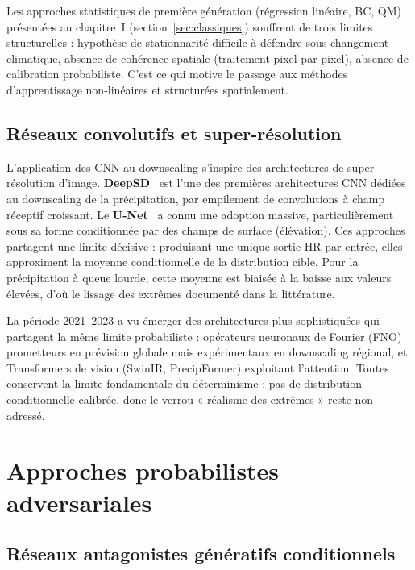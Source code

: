 \documentclass[14pt,a4paper,openany]{extreport}
\begin{document}
Les approches statistiques de première génération (régression linéaire, BC, QM) présentées au chapitre~I (section~\ref{sec:classiques}) souffrent de trois limites structurelles : hypothèse de stationnarité difficile à défendre sous changement climatique, absence de cohérence spatiale (traitement pixel par pixel), absence de calibration probabiliste. C'est ce qui motive le passage aux méthodes d'apprentissage non-linéaires et structurées spatialement.

\subsection{Réseaux convolutifs et super-résolution}
\label{ssec:soa-cnn}

L'application des CNN au downscaling s'inspire des architectures de super-résolution d'image. \textbf{DeepSD}~\cite{vandal_deepsd_2017} est l'une des premières architectures CNN dédiées au downscaling de la précipitation, par empilement de convolutions à champ réceptif croissant. Le \textbf{U-Net}~\cite{ronneberger_unet_2015} a connu une adoption massive, particulièrement sous sa forme conditionnée par des champs de surface (élévation). Ces approches partagent une limite décisive : produisant une unique sortie HR par entrée, elles approximent la moyenne conditionnelle de la distribution cible. Pour la précipitation à queue lourde, cette moyenne est biaisée à la baisse aux valeurs élevées, d'où le lissage des extrêmes documenté dans la littérature.

La période 2021--2023 a vu émerger des architectures plus sophistiquées qui partagent la même limite probabiliste : opérateurs neuronaux de Fourier (FNO) prometteurs en prévision globale mais expérimentaux en downscaling régional, et Transformers de vision (SwinIR, PrecipFormer) exploitant l'attention. Toutes conservent la limite fondamentale du déterminisme : pas de distribution conditionnelle calibrée, donc le verrou « réalisme des extrêmes » reste non adressé.

\section{Approches probabilistes adversariales}
\label{sec:soa-adv}

\subsection{Réseaux antagonistes génératifs conditionnels}
\label{ssec:soa-cgan}
\end{document}
